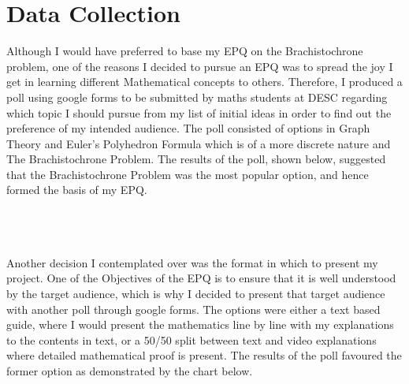 \documentclass[12pt]{report}
\begin{document}
\chapter{Data Collection}
Although I would have preferred to base my EPQ on the Brachistochrone problem, one of the reasons I decided to pursue an EPQ was to spread the joy I get in learning different Mathematical concepts to others. Therefore, I produced a poll using google forms to be submitted by maths students at DESC regarding which topic I should pursue from my list of initial ideas in order to find out the preference of my intended audience. The poll consisted of options in Graph Theory and Euler's Polyhedron Formula which is of a more discrete nature and The Brachistochrone Problem. The results of the poll, shown below, suggested that the Brachistochrone Problem was the most popular option, and hence formed the basis of my EPQ.
\\
\\
\\
\\
Another decision I contemplated over was the format in which to present my project. One of the Objectives of the EPQ is to ensure that it is well understood by the target audience, which is why I decided to present that target audience with another poll through google forms. The options were either a text based guide, where I would present the mathematics line by line with my explanations to the contents in text, or a 50/50 split between text and video explanations where detailed mathematical proof is present. The results of the poll favoured the former option as demonstrated by the chart below.
\\
\\
\end{document}
